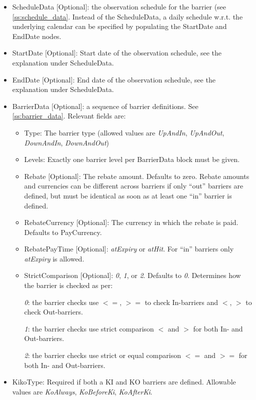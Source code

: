 \begin{itemize}
  \begin{itemize}
  \item ScheduleData [Optional]: the observation schedule for the barrier (see \ref{ss:schedule_data}. Instead of the ScheduleData,
    a daily schedule w.r.t. the underlying calendar can be specified by populating the StartDate and EndDate nodes.
  \item StartDate [Optional]: Start date of the observation schedule, see the explanation under ScheduleData.
  \item EndDate [Optional]: End date of the observation schedule, see the explanation under ScheduleData.
  \item BarrierData [Optional]: a sequence of barrier definitions. See \ref{ss:barrier_data}. Relevant fields are:
    \begin{itemize}
    \item Type: The barrier type (allowed values are \emph{UpAndIn}, \emph{UpAndOut}, \emph{DownAndIn}, \emph{DownAndOut})
    \item Levels: Exactly one barrier level per BarrierData block must be given.
    \item Rebate [Optional]: The rebate amount. Defaults to zero. Rebate amounts and currencies can be different across barriers
          if only ``out'' barriers are defined, but must be identical as soon as at least one ``in'' barrier is defined.
    \item RebateCurrency [Optional]: The currency in which the rebate is paid. Defaults to PayCurrency.
    \item RebatePayTime [Optional]: \emph{atExpiry} or \emph{atHit}. For ``in'' barriers only \emph{atExpiry} is allowed.
    \item StrictComparison [Optional]: \emph{0}, \emph{1}, or \emph{2}. Defaults to \emph{0}. Determines how the barrier is checked as per: 
    
     \emph{0}: the barrier checks use $<=$, $>=$ to check In-barriers and $<$, $>$ to check Out-barriers.

     \emph{1}: the barrier checks use strict comparison $<$ and $>$ for both In- and Out-barriers.

     \emph{2}: the barrier checks use strict or equal comparison $<=$ and $>=$ for both In- and Out-barriers.
    
    \end{itemize}
  \item KikoType: Required if both a KI and KO barriers are defined. Allowable values are \emph{KoAlways}, \emph{KoBeforeKi},
    \emph{KoAfterKi}.
  \end{itemize}


\end{itemize}
